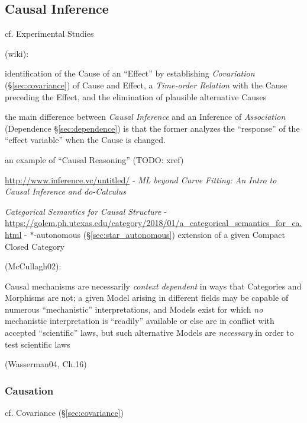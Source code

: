 \subsection{Causal Inference}\label{sec:causal_inference}

cf. Experimental Studies

(wiki):

identification of the Cause of an ``Effect'' by establishing \emph{Covariation}
(\S\ref{sec:covariance}) of Cause and Effect, a \emph{Time-order Relation} with
the Cause preceding the Effect, and the elimination of plausible alternative
Causes

the main difference between \emph{Causal Inference} and an Inference of
\emph{Association} (Dependence \S\ref{sec:dependence}) is that the former
analyzes the ``response'' of the ``effect variable'' when the Cause is changed.

an example of ``Causal Reasoning'' (TODO: xref)

\url{http://www.inference.vc/untitled/} - \emph{ML beyond Curve Fitting: An
  Intro to Causal Inference and do-Calculus}

\emph{Categorical Semantics for Causal Structure} -
\url{https://golem.ph.utexas.edu/category/2018/01/a_categorical_semantics_for_ca.html}
- $*$-autonomous (\S\ref{sec:star_autonomous}) extension of a given Compact
Closed Category

(McCullagh02):

Causal mechanisms are necessarily \emph{context dependent} in ways that
Categories and Morphisms are not;
a given Model arising in different fields may be capable of numerous
``mechanistic'' interpretations, and Models exist for which \emph{no}
mechanistic interpretation is ``readily'' available or else are in conflict
with accepted ``scientific'' laws, but such alternative Models are
\emph{necessary} in order to test scientific laws

(Wasserman04, Ch.16)



\subsubsection{Causation}\label{sec:causation}


cf. Covariance (\S\ref{sec:covariance})

